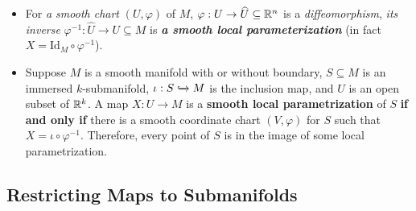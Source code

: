 \documentclass[11pt]{article}
\begin{document}
\begin{itemize}
\item \begin{remark}
For \emph{a smooth chart} $(U, \varphi)$ of $M$, $\varphi: U \rightarrow \widehat{U} \subseteq {\mathbb R}^{n}$ is a \emph{diffeomorphism}, \emph{its inverse} $\varphi^{-1}: \widehat{U} \rightarrow U \subseteq M$ is \emph{\textbf{a smooth local parameterization}} (in fact $X= \text{Id}_{M} \circ \varphi^{-1}$).
\end{remark}

\item \begin{proposition}
Suppose $M$ is a smooth manifold with or without boundary, $S \subseteq M$ is an immersed $k$-submanifold, $\iota: S \xhookrightarrow{} M$ is the inclusion map, and $U$ is an open subset of ${\mathbb R}^k$. A map $X: U \rightarrow M$ is a \textbf{smooth local parametrization} of $S$ \textbf{if and only if} there is a smooth coordinate chart $(V, \varphi)$ for $S$ such that \underline{$X = \iota \circ \varphi^{-1}$}. Therefore, every point of $S$ is in the image of some local parametrization.
\end{proposition}
\end{itemize}
\subsection{Restricting Maps to Submanifolds}
\end{document}
